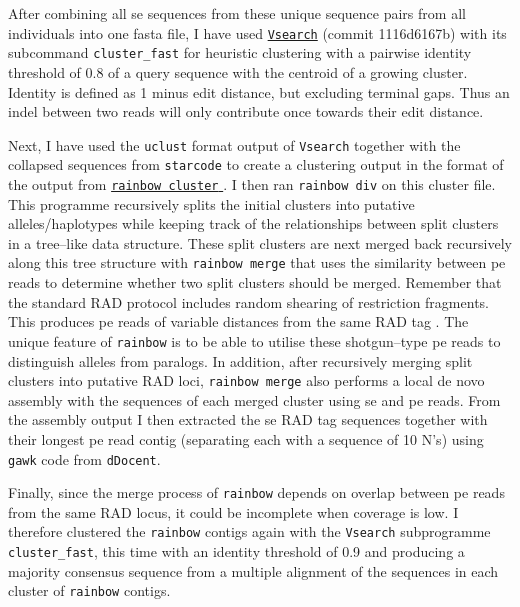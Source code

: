 \documentclass[a4paper,12pt,times,authoryear,twoside,print,index]{Classes/PhDThesisPSnPDF}\usepackage[]{graphicx}\usepackage[]{color}
\begin{document}
After combining all \gls{se} sequences from these unique sequence pairs from all individuals into one fasta file, I have used \href{https://github.com/torognes/vsearch}{\texttt{Vsearch}} (commit 1116d6167b) \citep{Rognes2016} with its subcommand \texttt{cluster\_fast} for heuristic clustering with a pairwise identity threshold of 0.8 of a query sequence with the centroid of a growing cluster. Identity is defined as 1 minus \gls{edit distance}, but excluding terminal gaps. Thus an indel between two reads will only contribute once towards their edit distance.

Next, I have used the \texttt{uclust} format output of \texttt{Vsearch} together with the collapsed sequences from \texttt{starcode} to create a clustering output in the format of the output from \href{https://sourceforge.net/projects/bio-rainbow/files/}{\texttt{rainbow cluster} }\citep{Chong2012}. I then ran \texttt{rainbow div} on this cluster file. This programme recursively splits the initial clusters into putative alleles/haplotypes while keeping track of the relationships between split clusters in a tree--like data structure. These split clusters are next merged back recursively along this tree structure with \texttt{rainbow merge} that uses the similarity between \gls{pe} reads to determine whether two split clusters should be merged. Remember that the standard RAD protocol \citep{Baird2008} includes random shearing of restriction fragments. This produces \gls{pe} reads of variable distances from the same RAD tag \citep{Etter2011}. The unique feature of \texttt{rainbow} is to be able to utilise these shotgun--type \gls{pe} reads to distinguish alleles from paralogs. In addition, after recursively merging split clusters into putative RAD loci, \texttt{rainbow merge} also performs a local de novo assembly with the sequences of each merged cluster using \gls{se} and \gls{pe} reads. From the assembly output I then extracted the \gls{se} RAD tag sequences together with their longest \gls{pe} read contig (separating each with a sequence of 10 N's) using \texttt{gawk} code from \texttt{dDocent}. 

Finally, since the merge process of \texttt{rainbow} depends on overlap between \gls{pe} reads from the same RAD locus, it could be incomplete when coverage is low. I therefore clustered the \texttt{rainbow} contigs again with the \texttt{Vsearch} subprogramme \texttt{cluster\_fast}, this time with an identity threshold of 0.9 and producing a majority consensus sequence from a multiple alignment of the sequences in each cluster of \texttt{rainbow} contigs.
\end{document}

